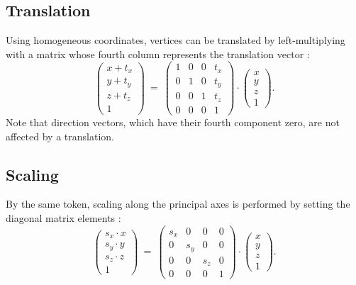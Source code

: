 \subsection{Translation}
Using homogeneous coordinates, vertices can be translated by left-multiplying with a 
matrix whose fourth column represents the translation vector \cite{web_gl_translate}:
\begin{equation}
	\left( \begin{array}{c} x + t_x \\ y + t_y \\ z + t_z \\ 1 \end{array} \right) 
	\ =\  
	\left( \begin{array}{cccc} 
		1 & 0 & 0 & t_x \\
		0 & 1 & 0 & t_y \\
		0 & 0 & 1 & t_z \\
		0 & 0 & 0 & 1
	\end{array} \right) \cdot
	\left( \begin{array}{c} x \\ y \\ z \\ 1 \end{array} \right).
\end{equation}
Note that direction vectors, which have their fourth component zero, are not affected by a translation.


\subsection{Scaling}
By the same token, scaling along the principal axes is performed by setting the diagonal matrix 
elements \cite{web_gl_scale}:
\begin{equation}
	\left( \begin{array}{c} s_x \cdot x \\ s_y \cdot y \\ s_z \cdot z \\ 1 \end{array} \right) 
	\ =\  
	\left( \begin{array}{cccc} 
		s_x & 0 & 0 & 0 \\
		0 & s_y & 0 & 0 \\
		0 & 0 & s_z & 0 \\
		0 & 0 & 0 & 1
	\end{array} \right) \cdot
	\left( \begin{array}{c} x \\ y \\ z \\ 1 \end{array} \right).
\end{equation}


